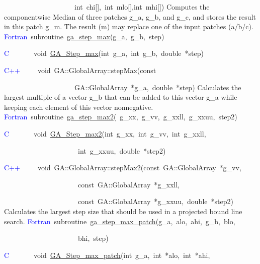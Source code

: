 ~~~~~~~~~~~~~~~~~~~~int~chi{[}{]},~int~mlo{[}{]},int~mhi{[}{]})
Computes the componentwise Median of three patches g\_a, g\_b, and
g\_c, and stores the result in this patch g\_m. The result (m) may
replace one of the input patches (a/b/c). 
\textcolor{blue}{Fortran}~subroutine~\href{http://www.emsl.pnl.gov/docs/global/ga_ops.html\#ga_step_max}{ga\_{}step\_{}max}(g\_a,~g\_b,~step)~

\textcolor{blue}{C}~~~~~~~void~\href{http://www.emsl.pnl.gov/docs/global/c_nga_ops.html\#ga_step_max}{GA\_{}Step\_{}max}(int~g\_a,~int~g\_b,~double~{*}step)~

\textcolor{blue}{C++~}~~~~void~GA::GlobalArray::stepMax(const~

~~~~~~~~~~~~~~~~~~~~GA::GlobalArray~{*}g\_a,~double~{*}step)
Calculates the largest multiple of a vector g\_b that can be added
to this vector g\_a while keeping each element of this vector nonnegative. 
\textcolor{blue}{Fortran}~subroutine~\href{http://www.emsl.pnl.gov/docs/global/ga_ops.html\#ga_step_max2}{ga\_{}step\_{}max2}(~g\_xx,~g\_vv,~g\_xxll,~g\_xxuu,~step2)~

\textcolor{blue}{C}~~~~~~~void~\href{http://www.emsl.pnl.gov/docs/global/c_nga_ops.html\#ga_step_max2}{GA\_{}Step\_{}max2}(int~g\_xx,~int~g\_vv,~int~g\_xxll,

~~~~~~~~~~~~~~~~~~~~~int~g\_xxuu,~double~{*}step2)

\textcolor{blue}{C++}~~~~~void~GA::GlobalArray::stepMax2(const~GA::GlobalArray~{*}g\_vv,~

~~~~~~~~~~~~~~~~~~~~~const~GA::GlobalArray~{*}g\_xxll,~

~~~~~~~~~~~~~~~~~~~~~const~GA::GlobalArray~{*}g\_xxuu,~double~{*}step2)
Calculates the largest step size that should be used in a projected
bound line search. 
\textcolor{blue}{Fortran}~subroutine~\href{http://www.emsl.pnl.gov/docs/global/ga_ops.html\#ga_step_max_patch}{ga\_{}step\_{}max\_{}patch}(g\_a,~alo,~ahi,~g\_b,~blo,

~~~~~~~~~~~~~~~~~~~~~bhi,~step)~

\textcolor{blue}{C}~~~~~~~void~\href{http://www.emsl.pnl.gov/docs/global/c_nga_ops.html\#ga_step_max_patch}{GA\_{}Step\_{}max\_{}patch}(int~g\_a,~int~{*}alo,~int~{*}ahi,~

